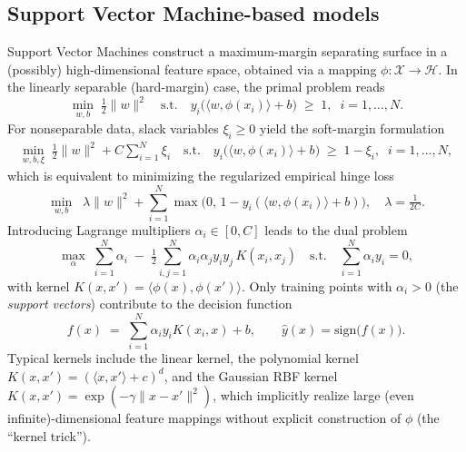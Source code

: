 \subsection{Support Vector Machine-based models}\label{sec:svm}

Support Vector Machines construct a maximum-margin separating surface in a (possibly) high-dimensional feature space, obtained via a mapping $\phi:\mathcal{X}\to\mathcal{H}$. In the linearly separable (hard-margin) case, the primal problem reads
\begin{equation}
\min_{w,b}\;\tfrac12\lVert w\rVert^2
\quad\text{s.t.}\quad
y_i\bigl(\langle w,\phi(x_i)\rangle + b\bigr)\;\ge\;1,\;\; i=1,\dots,N.
\label{eq:svm-hard-margin}
\end{equation}
For nonseparable data, slack variables $\xi_i\ge 0$ yield the soft-margin formulation
\begin{equation}
\begin{aligned}
\min_{w,b,\xi}\;\tfrac12\lVert w\rVert^2 + C\sum_{i=1}^N\xi_i
\quad\text{s.t.}\quad
y_i\bigl(\langle w,\phi(x_i)\rangle + b\bigr)\;\ge\;1-\xi_i,\;\; i=1,\dots,N,
\end{aligned}
\label{eq:svm-soft-margin}
\end{equation}
which is equivalent to minimizing the regularized empirical hinge loss
\begin{equation}
\min_{w,b}\;\; \lambda \lVert w\rVert^2 + \sum_{i=1}^N \max\bigl(0,\,1 - y_i(\langle w,\phi(x_i)\rangle+b)\bigr),
\quad \lambda=\tfrac{1}{2C}.
\label{eq:svm-empirical-hinge}
\end{equation}
Introducing Lagrange multipliers $\alpha_i\in[0,C]$ leads to the dual problem
\begin{equation}
\max_{\alpha}\;\sum_{i=1}^N \alpha_i \;-\; \tfrac12\sum_{i,j=1}^N \alpha_i\alpha_j y_i y_j \,K(x_i,x_j)
\quad\text{s.t.}\quad \sum_{i=1}^N \alpha_i y_i = 0,
\label{eq:svm-dual}
\end{equation}
with kernel $K(x,x')=\langle \phi(x),\phi(x')\rangle$. Only training points with $\alpha_i>0$ (the \emph{support vectors}) contribute to the decision function
\begin{equation}
f(x) \;=\; \sum_{i=1}^N \alpha_i y_i K(x_i,x) + b,\qquad \hat{y}(x) = \mathrm{sign}\bigl(f(x)\bigr).
\label{eq:svm-decision-function}
\end{equation}
Typical kernels include the linear kernel, the polynomial kernel $K(x,x')={(\langle x,x'\rangle + c)}^d$, and the Gaussian RBF kernel $K(x,x')=\exp(-\gamma\lVert x-x'\rVert^2)$, which implicitly realize large (even infinite)-dimensional feature mappings without explicit construction of $\phi$ (the ``kernel trick'').

